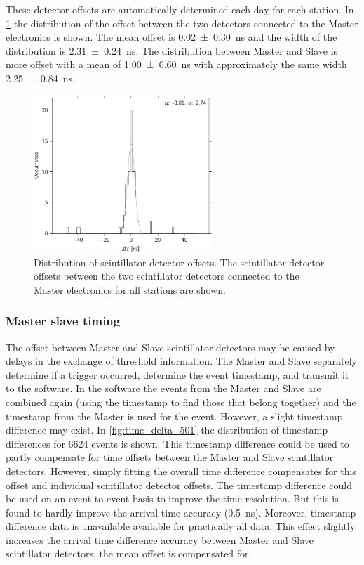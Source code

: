 These detector offsets are automatically determined each day for each station. In \cref{fig:detector_offset_distribution} the distribution of the offset between the two detectors connected to the Master electronics is shown. The mean offset is \SI{0.02 \pm 0.30}{\ns} and the width of the distribution is \SI{2.31 \pm 0.24}{\ns}. The distribution between Master and Slave is more offset with a mean of \SI{1.00 \pm 0.60}{\ns} with approximately the same width \SI{2.25 \pm 0.84}{\ns}.

\begin{figure}
    \centering
    \includegraphics[width=0.6\textwidth]
                    {plots/station/detector_offset_distribution}
    \caption{Distribution of scintillator detector offsets. The scintillator detector offsets between the two scintillator detectors connected to the Master electronics for all \hisparc stations are shown.}
    \label{fig:detector_offset_distribution}
\end{figure}


\subsubsection{Master slave timing}
\label{sec:masterslavetiming}

The offset between Master and Slave scintillator detectors may be caused by delays in the exchange of threshold information. The Master and Slave separately determine if a trigger occurred, determine the event timestamp, and  transmit it to the \daq software. In the \daq software the events from the Master and Slave are combined again (using the timestamp to find those that belong together) and the timestamp from the Master is used for the event. However, a slight timestamp difference may exist. In \cref{fig:time_delta_501} the distribution of timestamp differences for \num{6624} events is shown. This timestamp difference could be used to partly compensate for time offsets between the Master and Slave scintillator detectors. However, simply fitting the overall time difference compensates for this offset and individual scintillator detector offsets. The timestamp difference could be used on an event to event basis to improve the time resolution. But this is found to hardly improve the arrival time accuracy (\SI{0.5}{\ns}). Moreover, timestamp difference data is unavailable available for practically all \hisparc data. This effect slightly increases the arrival time difference accuracy between Master and Slave scintillator detectors, the mean offset is compensated for.

